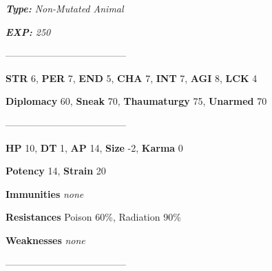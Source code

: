 \documentclass[11pt,a4paper,twocolumn]{book}
\begin{document}
	\noindent
	\emph{\textbf{Type:} Non-Mutated Animal}
	
	\noindent
	\emph{\textbf{EXP:} 250}
	
%		
%	
%		

	--------------------------------------

	\noindent
	\textbf{STR} 6, \textbf{PER} 7, \textbf{END} 5, \textbf{CHA} 7, \textbf{INT} 7, \textbf{AGI} 8, \textbf{LCK} 4
	
	\noindent
	\textbf{Diplomacy} 60, \textbf{Sneak} 70, \textbf{Thaumaturgy} 75, \textbf{Unarmed} 70
	
	--------------------------------------
	
	\noindent
	\textbf{HP} 10, \textbf{DT} 1, \textbf{AP} 14, \textbf{Size} -2, \textbf{Karma} 0
	
	\noindent
	\textbf{Potency} 14, \textbf{Strain} 20
	
	\noindent
	\textbf{Immunities} \emph{none} %
	
	\noindent
	\textbf{Resistances} Poison 60\%, Radiation 90\%%
	
	\noindent
	\textbf{Weaknesses} \emph{none}%
	
	--------------------------------------
	
\end{document}
